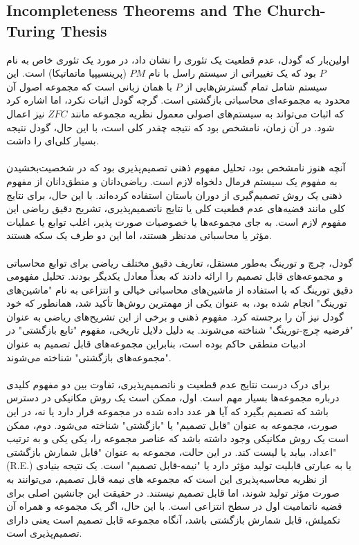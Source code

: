 \documentclass[10pt,a4paper]{article}
\begin{document}
                        \subsection{Incompleteness Theorems and The Church-Turing Thesis}
اولین‌بار که گودل، عدم قطعیت یک تئوری را نشان داد، در مورد یک تئوری خاص به نام $P$ بود که یک تغییراتی از سیستم راسل با نام $PM$ (پرینسیپیا ماتماتیکا) است. این سیستم شامل تمام گسترش‌هایی از $P$ با همان زبانی است که مجموعه اصول آن محدود به مجموعه‌ای محاسباتی بازگشتی است. گرچه گودل اثبات نکرد، اما اشاره کرد که اثبات می‌تواند به سیستم‌های اصولی معمول نظریه مجموعه مانند $ZFC$ نیز اعمال شود. در آن زمان، نامشخص بود که نتیجه چقدر کلی است، با این حال، گودل نتیجه بسیار کلی‌ای را داشت.
                            \\
                            \\
آنچه هنوز نامشخص بود، تحلیل مفهوم ذهنی تصمیم‌پذیری بود که در شخصیت‌بخشیدن به مفهوم یک سیستم فرمال دلخواه لازم است. ریاضی‌دانان و منطق‌دانان از مفهوم ذهنی یک روش تصمیم‌گیری از دوران باستان استفاده کرده‌اند. با این حال، برای نتایج کلی مانند قضیه‌های عدم قطعیت کلی یا نتایج ناتصمیم‌پذیری، تشریح دقیق ریاضی این مفهوم لازم است. به جای مجموعه‌ها یا خصوصیات صورت پذیر، اغلب توابع یا عملیات مؤثر یا محاسباتی مدنظر هستند، اما این دو طرف یک سکه هستند.
                            \\
                            \\
گودل، چرچ و تورینگ به‌طور مستقل، تعاریف دقیق مختلف ریاضی برای توابع محاسباتی و مجموعه‌های قابل تصمیم را ارائه دادند که بعداً معادل یکدیگر بودند. تحلیل مفهومی دقیق تورینگ که با استفاده از ماشین‌های محاسباتی خیالی و انتزاعی به نام "ماشین‌های تورینگ" انجام شده بود، به عنوان یکی از مهمترین روش‌ها تأکید شد، همانطور که خود گودل نیز آن را برجسته کرد. مفهوم ذهنی و برخی از این تشریح‌های ریاضی به عنوان "فرضیه چرچ-تورینگ" شناخته می‌شوند. به دلیل دلایل تاریخی، مفهوم "تابع بازگشتی" در ادبیات منطقی حاکم بوده است، بنابراین مجموعه‌های قابل تصمیم به عنوان "مجموعه‌های بازگشتی" شناخته می‌شوند.
                            \\
                            \\
برای درک درست نتایج عدم قطعیت و ناتصمیم‌پذیری، تفاوت بین دو مفهوم کلیدی درباره مجموعه‌ها بسیار مهم است. اول، ممکن است یک روش مکانیکی در دسترس باشد که تصمیم بگیرد که آیا هر عدد داده شده در مجموعه قرار دارد یا نه، در این صورت، مجموعه به عنوان "قابل تصمیم" یا "بازگشتی" شناخته می‌شود. دوم، ممکن است یک روش مکانیکی وجود داشته باشد که عناصر مجموعه را، یکی یکی و به ترتیب اعداد، بیابد یا لیست کند. در این حالت، مجموعه به عنوان "قابل شمارش بازگشتی" (R.E.) یا به عبارتی قابلیت تولید مؤثر دارد یا "نیمه-قابل تصمیم" است. یک نتیجه بنیادی از نظریه محاسبه‌پذیری این است که مجموعه های نیمه قابل تصمیم، می‌توانند به صورت مؤثر تولید شوند، اما قابل تصمیم نیستند. در حقیقت این جانشین اصلی برای قضیه ناتمامیت اول در سطح انتزاعی است. با این حال، اگر یک مجموعه و همراه آن تکمیلش، قابل شمارش بازگشتی باشد، آنگاه مجموعه قابل تصمیم است یعنی دارای تصمیم‌پذیری است.\cite{sep-church-turing}
\end{document}
